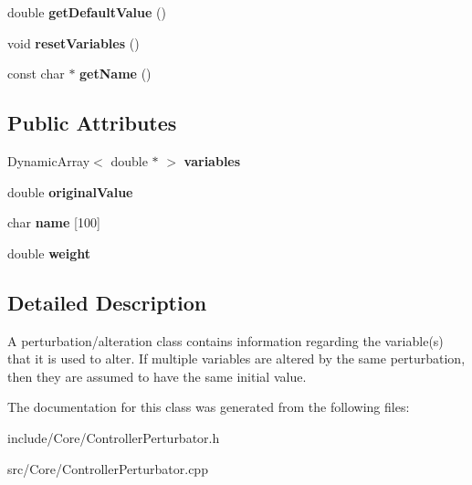 \begin{DoxyCompactItemize}
\item 
\hypertarget{classCartWheel_1_1Core_1_1Perturbation_a64bb39cb87c4e799365ae8788fe265fa}{
double {\bfseries getDefaultValue} ()}
\label{classCartWheel_1_1Core_1_1Perturbation_a64bb39cb87c4e799365ae8788fe265fa}

\item 
\hypertarget{classCartWheel_1_1Core_1_1Perturbation_aac2288860c6d2542fd20485e261c2dfb}{
void {\bfseries resetVariables} ()}
\label{classCartWheel_1_1Core_1_1Perturbation_aac2288860c6d2542fd20485e261c2dfb}

\item 
\hypertarget{classCartWheel_1_1Core_1_1Perturbation_a33947c5f12653fbda760c316c1f2aed7}{
const char $\ast$ {\bfseries getName} ()}
\label{classCartWheel_1_1Core_1_1Perturbation_a33947c5f12653fbda760c316c1f2aed7}

\end{DoxyCompactItemize}
\subsection*{Public Attributes}
\begin{DoxyCompactItemize}
\item 
\hypertarget{classCartWheel_1_1Core_1_1Perturbation_ab62de8ec335920f42fc3679d5e7aaac7}{
DynamicArray$<$ double $\ast$ $>$ {\bfseries variables}}
\label{classCartWheel_1_1Core_1_1Perturbation_ab62de8ec335920f42fc3679d5e7aaac7}

\item 
\hypertarget{classCartWheel_1_1Core_1_1Perturbation_a856e8dff7e4bdcb778e275150e1bb101}{
double {\bfseries originalValue}}
\label{classCartWheel_1_1Core_1_1Perturbation_a856e8dff7e4bdcb778e275150e1bb101}

\item 
\hypertarget{classCartWheel_1_1Core_1_1Perturbation_a900d9e399eb74b8b6703598d138205bc}{
char {\bfseries name} \mbox{[}100\mbox{]}}
\label{classCartWheel_1_1Core_1_1Perturbation_a900d9e399eb74b8b6703598d138205bc}

\item 
\hypertarget{classCartWheel_1_1Core_1_1Perturbation_a9357b76673fab2e9e7bbc0955331b866}{
double {\bfseries weight}}
\label{classCartWheel_1_1Core_1_1Perturbation_a9357b76673fab2e9e7bbc0955331b866}

\end{DoxyCompactItemize}


\subsection{Detailed Description}
A perturbation/alteration class contains information regarding the variable(s) that it is used to alter. If multiple variables are altered by the same perturbation, then they are assumed to have the same initial value. 

The documentation for this class was generated from the following files:\begin{DoxyCompactItemize}
\item 
include/Core/ControllerPerturbator.h\item 
src/Core/ControllerPerturbator.cpp\end{DoxyCompactItemize}
